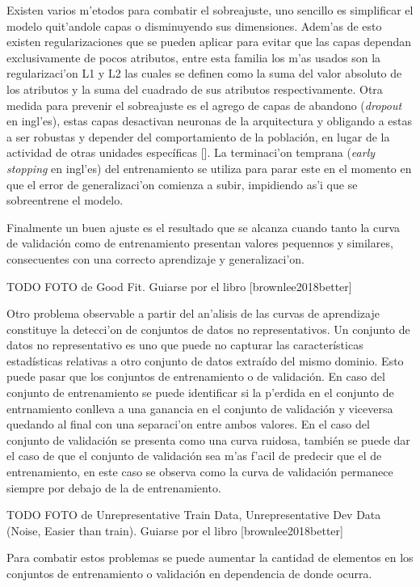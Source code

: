 Existen varios m'etodos para combatir el sobreajuste, uno sencillo es simplificar el modelo quit'andole capas 
o disminuyendo sus dimensiones. Adem'as de esto existen regularizaciones que se pueden aplicar para evitar que 
las capas dependan exclusivamente de pocos atributos, entre esta familia los m'as usados son la regularizaci'on
L1 y L2 las cuales se definen como la suma del valor absoluto de los atributos y la suma del cuadrado de sus 
atributos respectivamente. Otra medida para prevenir el sobreajuste es el agrego de capas de abandono 
(\emph{dropout} en ingl'es), estas capas desactivan neuronas de la arquitectura y obligando a 
estas a ser robustas y depender del comportamiento de la población, en lugar de la actividad de otras unidades 
específicas [\cite{baldi2013dropout}]. La terminaci'on temprana (\emph{early stopping} en ingl'es) del entrenamiento
se utiliza para parar este en el momento en que el error de generalizaci'on comienza a subir, impidiendo as'i que 
se sobreentrene el modelo.

Finalmente un buen ajuste es el resultado que se alcanza cuando tanto la curva de validación como de entrenamiento
presentan valores pequennos y similares, consecuentes con una correcto aprendizaje y generalizaci'on.

TODO FOTO de Good Fit. Guiarse por el libro [brownlee2018better]

Otro problema observable a partir del an'alisis de las curvas de aprendizaje constituye la detecci'on de conjuntos
de datos no representativos. Un conjunto de datos no representativo es uno que puede no 
capturar las características estadísticas relativas a otro conjunto de datos extraído del mismo dominio.
Esto puede pasar que los conjuntos de entrenamiento o de validación. En caso del conjunto de entrenamiento
se puede identificar si la p'erdida en el conjunto de entrnamiento conlleva a una ganancia en el conjunto de 
validación y viceversa quedando al final con una separaci'on entre ambos valores. En el caso del conjunto de 
validación se presenta como una curva ruidosa, también se puede dar el caso de que el conjunto  de validación
sea m'as f'acil de predecir que el de entrenamiento, en este caso se observa como la curva de validación permanece
siempre por debajo de la de entrenamiento.

TODO FOTO de Unrepresentative Train Data, Unrepresentative Dev Data (Noise, Easier than train). Guiarse por el libro [brownlee2018better]

Para combatir estos problemas se puede aumentar la cantidad de elementos en los conjuntos de entrenamiento o 
validación en dependencia de donde ocurra.

